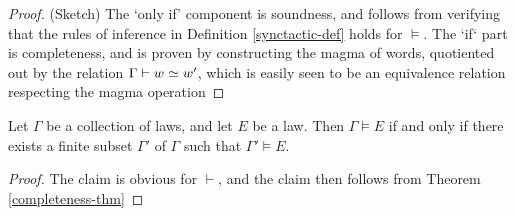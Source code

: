 \begin{proof} (Sketch) The `only if' component is soundness, and follows from verifying that the rules of inference in Definition \ref{synctactic-def} holds for $\models$.  The `if` part is completeness, and is proven by constructing the magma of words, quotiented out by the relation $\Gamma \vdash w \simeq w'$, which is easily seen to be an equivalence relation respecting the magma operation
\end{proof}

\begin{corollary}\label{compactness-thm}  Let $\Gamma$ be a collection of laws, and let $E$ be a law.  Then $\Gamma \models E$ if and only if there exists a finite subset $\Gamma'$ of $\Gamma$ such that $\Gamma' \models E$.
\end{corollary}

\begin{proof} The claim is obvious for $\vdash$, and the claim then follows from Theorem \ref{completeness-thm}
\end{proof}

